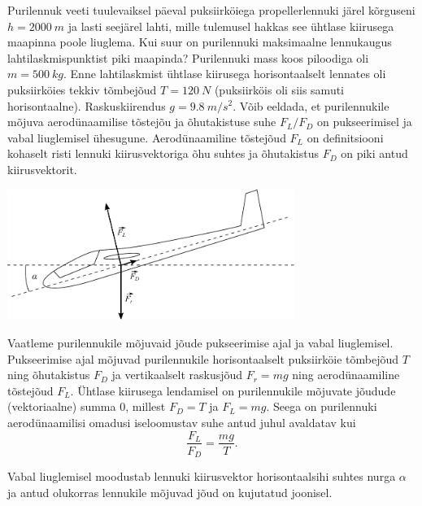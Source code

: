 \setAuthor{}

Purilennuk veeti tuulevaiksel päeval puksiirköiega propellerlennuki järel kõrguseni $h = \SI{2000}{m}$ ja lasti seejärel lahti, mille tulemusel hakkas see ühtlase kiirusega maapinna poole liuglema. Kui suur on purilennuki maksimaalne lennukaugus lahtilaskmispunktist piki maapinda? Purilennuki mass koos piloodiga oli $m = \SI{500}{kg}$. Enne lahtilaskmist ühtlase kiirusega horisontaalselt lennates oli puksiirköies tekkiv tõmbejõud $T = \SI{120}{N}$ (puksiirköis oli siis samuti horisontaalne). Raskuskiirendus $g = \SI{9.8}{m/s^2}$. Võib eeldada, et purilennukile mõjuva aerodünaamilise tõstejõu ja õhutakistuse suhe $F_L/F_D$ on pukseerimisel ja vabal liuglemisel ühesugune. Aerodünaamiline tõstejõud $F_L$ on definitsiooni kohaselt risti lennuki kiirusvektoriga õhu suhtes ja õhutakistus $F_D$ on piki antud kiirusvektorit. 


\hint

\solu
\begin{center}
	\vspace{-30pt}
  \includegraphics[width=0.7\textwidth]{2020-v2g-05-yl.pdf}
\end{center}


Vaatleme purilennukile mõjuvaid jõude pukseerimise ajal ja vabal liuglemisel. Pukseerimise ajal mõjuvad purilennukile horisontaalselt puksiirköie tõmbejõud $T$ ning õhutakistus $F_D$ ja vertikaalselt raskusjõud $F_r = mg$ ning aerodünaamiline tõstejõud $F_L$. Ühtlase kiirusega lendamisel on purilennukile mõjuvate jõudude (vektoriaalne) summa 0, millest $F_D = T$ ja $F_L = mg$. Seega on purilennuki aerodünaamilisi omadusi iseloomustav suhe antud juhul avaldatav kui
\begin{equation}
	\frac{F_L}{F_D} = \frac{mg}{T}.
\end{equation}

Vabal liuglemisel moodustab lennuki kiirusvektor horisontaalsihi suhtes nurga $\alpha$ ja antud olukorras lennukile mõjuvad jõud on kujutatud joonisel.


